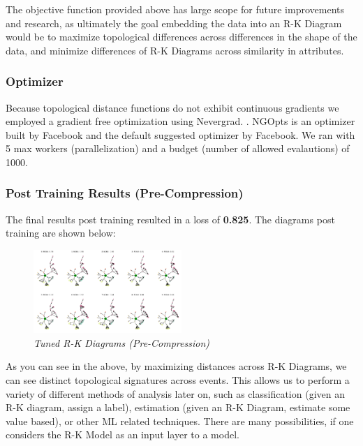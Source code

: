 The objective function provided above has large scope for future improvements and research, as ultimately the goal embedding the data into an R-K Diagram would be to maximize topological differences across differences in the shape of the data, and minimize differences of R-K Diagrams across similarity in attributes.

\subsubsection{Optimizer}
\label{sec:Optimizer}

Because topological distance functions do not exhibit continuous gradients we employed a gradient free optimization using Nevergrad. \cite{a2020_nevergrad}. NGOpts is an optimizer built by Facebook and the default suggested optimizer by Facebook. We ran with 5 max workers (parallelization) and a budget (number of allowed evalautions) of 1000.

\subsubsection{Post Training Results (Pre-Compression)}

The final results post training resulted in a loss of \textbf{0.825}. The diagrams post training are shown below:

\begin{figure}[H]
	\centering
        \includegraphics[width=0.5\textwidth]{images/store_sales_trained_data.png}
	\caption{\textit{Tuned R-K Diagrams (Pre-Compression)}}
	\label{fig:store_sales_trained_data}
\end{figure}

As you can see in the above, by maximizing distances across R-K Diagrams, we can see distinct topological signatures across events. This allows us to perform a variety of different methods of analysis later on, such as classification (given an R-K diagram, assign a label), estimation (given an R-K Diagram, estimate some value based), or other ML related techniques. There are many possibilities, if one considers the R-K Model as an input layer to a model.

